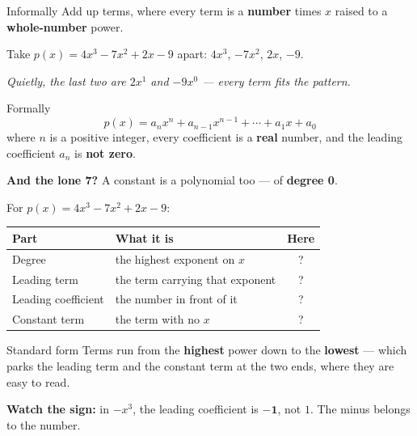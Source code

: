 \documentclass[aspectratio=169, 11pt]{beamer}
\begin{document}
\begin{frame}[t, plain]

  \begin{block}{Informally}
    Add up terms, where every term is a \textbf{number} times $x$ raised to a
    \textbf{whole-number} power.
  \end{block}

  \medskip
  Take $p(x) = 4x^3 - 7x^2 + 2x - 9$ apart: \quad
  $4x^3$, \quad $-7x^2$, \quad $2x$, \quad $-9$.

  \smallskip
  \textit{Quietly, the last two are $2x^1$ and $-9x^0$ --- every term fits the pattern.}

  \bigskip
  \begin{block}{Formally}
    \[
      p(x) = a_n x^n + a_{n-1}x^{n-1} + \cdots + a_1 x + a_0
    \]
    where $n$ is a positive integer, every coefficient is a \textbf{real} number,
    and the leading coefficient $a_n$ is \textbf{not zero}.
  \end{block}

  \medskip
  \textbf{And the lone 7?} A constant is a polynomial too --- of \textbf{degree 0}.
\end{frame}

\begin{frame}[t, plain]

  For $p(x) = 4x^3 - 7x^2 + 2x - 9$:

  \medskip
  \begin{tabular}{|p{}|p{}|c|}
  \hline
  \textbf{Part} & \textbf{What it is} & \textbf{Here} \\
  \hline
  Degree & the highest exponent on $x$ & ? \\
  \hline
  Leading term & the term carrying that exponent & ? \\
  \hline
  Leading coefficient & the number in front of it & ? \\
  \hline
  Constant term & the term with no $x$ & ? \\
  \hline
  \end{tabular}

  \bigskip
  \begin{block}{Standard form}
    Terms run from the \textbf{highest} power down to the \textbf{lowest} --- which
    parks the leading term and the constant term at the two ends, where they are
    easy to read.
  \end{block}

  \medskip
  \textbf{Watch the sign:} in $-x^3$, the leading coefficient is $\mathbf{-1}$, not
  $1$. The minus belongs to the number.
\end{frame}
\end{document}
